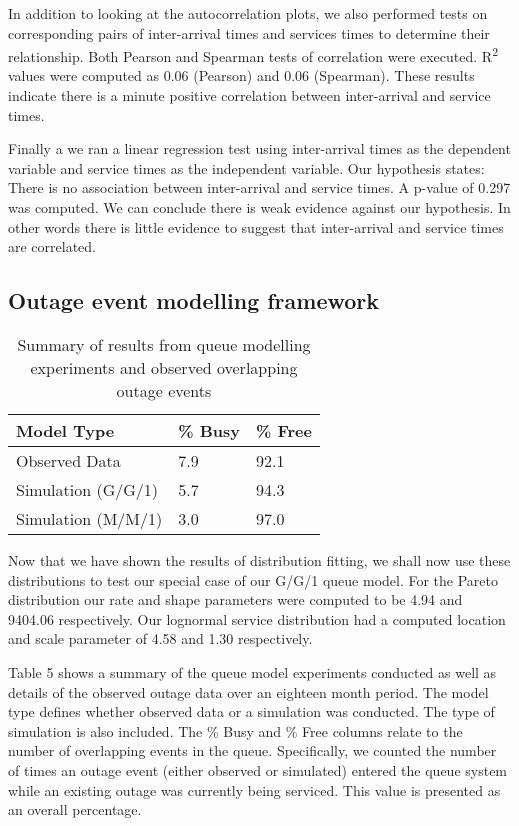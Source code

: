 \documentclass[5p]{elsarticle}
\begin{document}
In addition to looking at the autocorrelation plots, we also performed tests on corresponding pairs of inter-arrival times and services times to determine their relationship. Both Pearson and Spearman tests of correlation were executed. R\textsuperscript{2} values were computed as 0.06 (Pearson) and 0.06 (Spearman). These results indicate there is a minute positive correlation between inter-arrival and service times.

Finally a we ran a linear regression test using inter-arrival times as the dependent variable and service times as the independent variable. Our hypothesis states: There is no association between inter-arrival and service times. A p-value of 0.297 was computed. We can conclude there is weak evidence against our hypothesis. In other words there is little evidence to suggest that inter-arrival and service times are correlated. 

\subsection{Outage event modelling framework}

\begin {table}[]
\caption {Summary of results from queue modelling experiments and observed overlapping outage events} 
\begin{center}
\begin{tabular}{l | l | l} \bf{Model Type} & \bf {\% Busy} & \bf {\% Free}
\\ \hline Observed Data & 7.9 &  92.1 
\\  Simulation (G/G/1) & 5.7 &  94.3 
\\  Simulation (M/M/1) & 3.0  &  97.0 
\\ \hline 
 \end{tabular}
\end{center}
\end{table}

Now that we have shown the results of distribution fitting, we shall now use these distributions to test our special case of our G/G/1 queue model. For the Pareto distribution our rate and shape parameters were computed to be 4.94 and 9404.06 respectively. Our 
lognormal service distribution had a computed location and scale parameter of 4.58 and 1.30 respectively.

Table 5 shows a summary of the queue model experiments conducted as well as details of the observed outage data over an eighteen month period. The model type defines whether observed data or a simulation was conducted. The type of simulation is also included. The \% Busy and \% Free columns relate to the number of overlapping events in the queue. Specifically, we counted the number of times an outage event (either observed or simulated) entered the queue system while an existing outage was currently being serviced. This value is presented as an overall percentage. 
\end{document}
